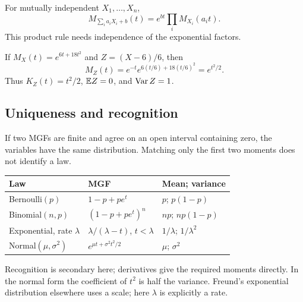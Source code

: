 For mutually independent $X_1,\ldots,X_n$,
\[
M_{\sum_i a_iX_i+b}(t)=e^{bt}\prod_iM_{X_i}(a_it).
\]
This product rule needs independence of the exponential factors.
\begin{example}
If $M_X(t)=e^{6t+18t^2}$ and $Z=(X-6)/6$, then
\[
M_Z(t)=e^{-t}e^{6(t/6)+18(t/6)^2}=e^{t^2/2}.
\]
Thus $K_Z(t)=t^2/2$, $\mathbb E Z=0$, and $\operatorname{Var} Z=1$.
\end{example}
\subsection{Uniqueness and recognition}
If two MGFs are finite and agree on an open interval containing zero, the variables have the same distribution. Matching only the first two moments does not identify a law.
\begin{center}\begin{tabular}{lll}
\toprule Law & MGF & Mean; variance\\\midrule
Bernoulli$(p)$ & $1-p+pe^t$ & $p$; $p(1-p)$\\
Binomial$(n,p)$ & $(1-p+pe^t)^n$ & $np$; $np(1-p)$\\
Exponential, rate $\lambda$ & $\lambda/(\lambda-t)$, $t<\lambda$ & $1/\lambda$; $1/\lambda^2$\\
Normal$(\mu,\sigma^2)$ & $e^{\mu t+\sigma^2t^2/2}$ & $\mu$; $\sigma^2$\\\bottomrule
\end{tabular}\end{center}
Recognition is secondary here; derivatives give the required moments directly. In the normal form the coefficient of $t^2$ is half the variance. Freund's exponential distribution elsewhere uses a scale; here $\lambda$ is explicitly a rate.
